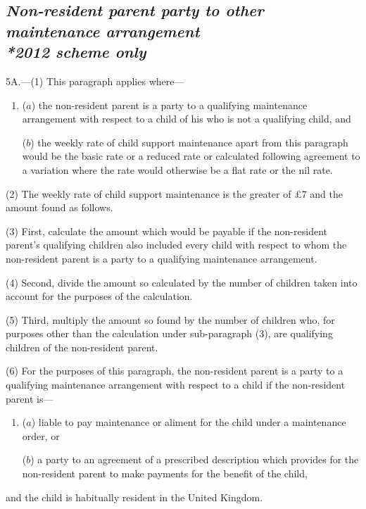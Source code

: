 \documentclass[12pt,a4paper]{article}
\begin{document}

\subsection*{\itshape Non-resident parent party to other maintenance arrangement\\*\emph{2012 scheme only}}

5A.---(1) This paragraph applies where—
\begin{enumerate}\item[]
($a$) the non-resident parent is a party to a qualifying maintenance arrangement with respect to a child of his who is not a qualifying child, and

($b$) the weekly rate of child support maintenance apart from this paragraph would be the basic rate or a reduced rate or calculated following agreement to a variation where the rate would otherwise be a flat rate or the nil rate.
\end{enumerate}

(2) The weekly rate of child support maintenance is the greater of 
£7   %
and the amount found as follows.

(3) First, calculate the amount which would be payable if the non-resident parent's qualifying children also included every child with respect to whom the non-resident parent is a party to a qualifying maintenance arrangement.

(4) Second, divide the amount so calculated by the number of children taken into account for the purposes of the calculation.

(5) Third, multiply the amount so found by the number of children who, for purposes other than the calculation under sub-\hspace{0pt}paragraph (3), are qualifying children of the non-resident parent.

(6) For the purposes of this paragraph, the non-resident parent is a party to a qualifying maintenance arrangement with respect to a child if the non-resident parent is—
\begin{enumerate}\item[]
($a$) liable to pay maintenance or aliment for the child under a maintenance order, or

($b$) a party to an agreement of a prescribed description which provides for the non-resident parent to make payments for the benefit of the child,
\end{enumerate}
and the child is habitually resident in the United Kingdom.
\end{document}
